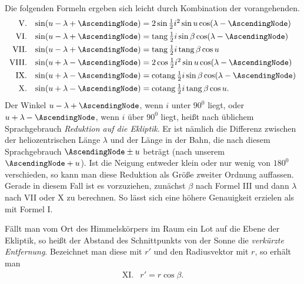 Die folgenden Formeln ergeben sich leicht durch Kombination der vorangehenden.
\[
\begin{array}{rl}
\mathrm{V.}&\sin(u-\lambda+\AscendingNode)=2\sin\tfrac{1}{2}i^2\sin u\cos(\lambda-\AscendingNode)\\[4pt]
\mathrm{VI.}&\sin(u-\lambda+\AscendingNode)=\operatorname{tang}\tfrac{1}{2}i\sin\beta\cos(\lambda-\AscendingNode)\\[4pt]
\mathrm{VII.}&\sin(u-\lambda+\AscendingNode)=\operatorname{tang}\tfrac{1}{2}i\operatorname{tang}\beta\cos u\\[4pt]
\mathrm{VIII.}&\sin(u+\lambda-\AscendingNode)=2\cos\tfrac{1}{2}i^2\sin u\cos(\lambda-\AscendingNode)\\[4pt]
\mathrm{IX.}&\sin(u+\lambda-\AscendingNode)=\operatorname{cotang}\tfrac{1}{2}i\sin\beta\cos(\lambda-\AscendingNode)\\[4pt]
\mathrm{X.}&\sin(u+\lambda-\AscendingNode)=\operatorname{cotang}\tfrac{1}{2}i\operatorname{tang}\beta\cos u.
\end{array}
\]
Der Winkel $u-\lambda+\AscendingNode$, wenn $i$ unter $90^0$ liegt, oder $u+\lambda-\AscendingNode$, wenn $i$ über $90^0$ liegt, heißt nach üblichem Sprachgebrauch \emph{Reduktion auf die Ekliptik}. Er ist nämlich die Differenz zwischen der heliozentrischen Länge $\lambda$ und der Länge in der Bahn, die nach diesem Sprachgebrauch $\AscendingNode\pm u$ beträgt (nach unserem $\AscendingNode+u$). Ist
die Neigung entweder klein oder nur wenig von $180^0$ verschieden, so kann man diese Reduktion als Größe zweiter Ordnung auffassen. Gerade in diesem Fall ist es vorzuziehen, zunächst $\beta$ nach Formel III und dann $\lambda$ nach VII oder X zu berechnen. So lässt sich eine höhere Genauigkeit erzielen als mit Formel I.

Fällt man vom Ort des Himmelskörpers im Raum ein Lot auf die Ebene der Ekliptik, so heißt der Abstand des Schnittpunkts von der Sonne die \emph{verkürzte Entfernung}. Bezeichnet man diese mit $r'$ und den Radiusvektor mit $r$, so erhält man
\[
\begin{array}{rl}
\mathrm{XI.}&r'=r\cos\beta.
\end{array}
\]
